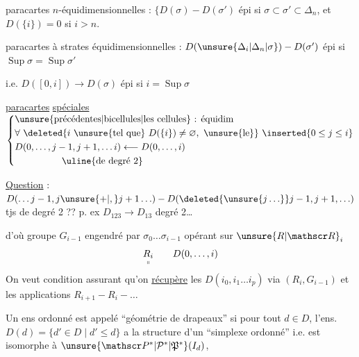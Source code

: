 paracartes $n$-équidimensionnelles : $\big\{D(\sigma)\mathbin{-}D(\sigma')$  épi si  $\sigma\subset\sigma'\subset\Delta_n$, et $D(\{i\})=0$ si $i>n$.

paracartes à  strates équidimensionnelles : $D(\unsure{\Delta_i|\Delta_n|\sigma})\mathbin{-}D(\sigma')$ épi si $\operatorname{Sup}\sigma=\operatorname{Sup}\sigma'$

i.e. $D([0,i])\to D(\sigma)$ épi si $i=\operatorname{Sup}\sigma$

\uline{paracartes} \uline{spéciales} \quad $\left\{\begin{aligned}
 &\text{\unsure{précédentes|bicellules|les cellules} : équidim}\\
 &\forall\ \deleted{i\ \text{\unsure{tel que}}\ D(\{i\})\ne\varnothing,\ \text{\unsure{le}}}\ \inserted{0\leq j\leq i}\\
 &D(0,\ldots,j-1,j+1,\ldots i)\longleftarrow D(0,\ldots,i)\\
 &\hspace{5em}\text{\uline{de degré 2}}
 \end{aligned}\right.$


\uline{Question} :  $D(\ldots j-1,j\unsure{+|,}j+1\ldots)\mathbin{-}D(\deleted{\unsure{j\ldots}}j-1,j+1,\ldots)$ tjs de degré 2 ?? p. ex $D_{123}\to D_{13}$ degré 2\ldots

d'où groupe $G_{i-1}$ engendré par $\sigma_0\ldots\sigma_{i-1}$ opérant sur $\unsure{R|\mathscr R}_i$
\[
 \underset{\shortparallel}{R_i}\qquad D(0,\ldots,i)
\]
On veut condition assurant qu'on \uline{récupère} les  $D(i_0,i_1\ldots i_p)$  via $(R_i,G_{i-1})$ et les applications $R_{i+1}\mathbin{-}R_i\mathbin{-}\ldots$


Un ens ordonné  est appelé ``géométrie de drapeaux'' si pour tout $d\in D$, l'ens.   $D(d)=\{d'\in D\mid d'\leq d\}$ a la structure d'un ``simplexe ordonné'' i.e. est isomorphe à $\unsure{\mathscr P^*|\mathcal P^*|\mathfrak P^*}(I_d)$,

